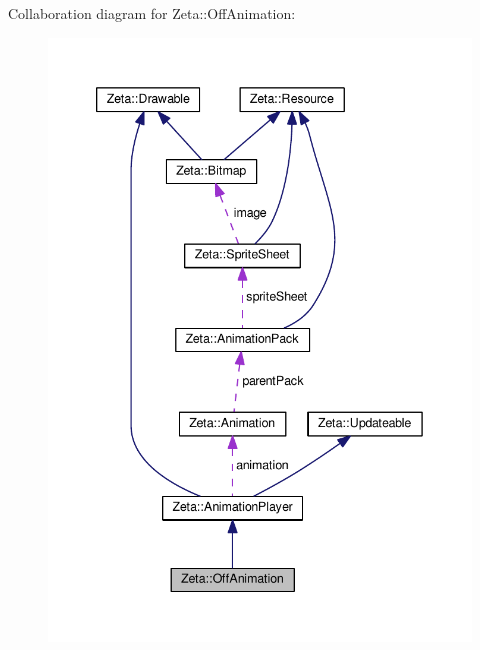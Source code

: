 Collaboration diagram for Zeta\+:\+:Off\+Animation\+:
\nopagebreak
\begin{figure}[H]
\begin{center}
\leavevmode
\includegraphics[width=342pt]{classZeta_1_1OffAnimation__coll__graph}
\end{center}
\end{figure}
